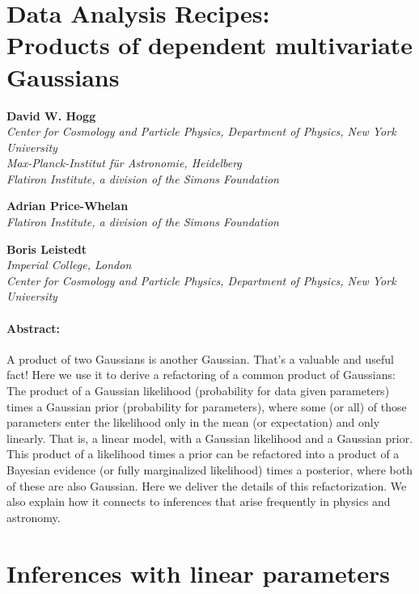 \documentclass[12pt, letterpaper]{article}
\begin{document}
\section*{Data Analysis Recipes:\\ Products of dependent multivariate Gaussians}

\noindent\textbf{David W. Hogg}\\
{\footnotesize%
  \textsl{Center for Cosmology and Particle Physics, Department of Physics, New York University}\\
  \textsl{Max-Planck-Institut f\"ur Astronomie, Heidelberg}\\
  \textsl{Flatiron Institute, a division of the Simons Foundation}%
}

\medskip\noindent\textbf{Adrian Price-Whelan}\\
{\footnotesize%
  \textsl{Flatiron Institute, a division of the Simons Foundation}%
}

\medskip\noindent\textbf{Boris Leistedt}\\
{\footnotesize%
  \textsl{Imperial College, London}\\
  \textsl{Center for Cosmology and Particle Physics, Department of Physics, New York University}%
}

\paragraph{Abstract:}
A product of two Gaussians is another Gaussian.
That's a valuable and useful fact!
Here we use it to derive a refactoring of a common product of
Gaussians:
The product of a Gaussian likelihood (probability for data given
parameters) times a Gaussian prior (probability for parameters),
where some (or all) of those parameters enter the likelihood
only in the mean (or expectation) and only linearly.
That is, a linear model, with a Gaussian likelihood and a Gaussian
prior.
This product of a likelihood times a prior can be refactored into a
product of a Bayesian evidence (or fully marginalized likelihood)
times a posterior, where both of these are also Gaussian.
Here we deliver the details of this refactorization.
We also explain how it connects to inferences that arise frequently in
physics and astronomy.

\section{Inferences with linear parameters}
\end{document}
